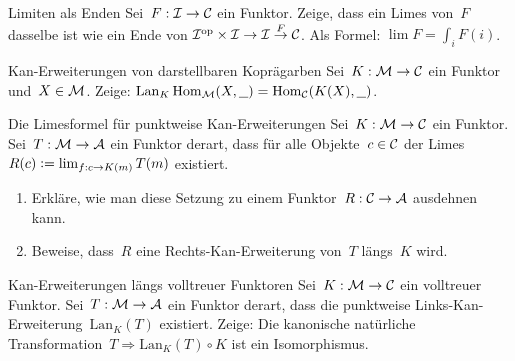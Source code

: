 \documentclass{uebblatt}
\begin{document}

\begin{aufgabe}{Limiten als Enden}
Sei~$F : \mathcal{I} \to \mathcal{C}$ ein Funktor. Zeige, dass ein Limes von~$F$ dasselbe ist wie ein
Ende von $\mathcal{I}^{\mathrm{op}} \times \mathcal{I} \to \mathcal{I} \stackrel{F}{\to} \mathcal{C}$. Als Formel: $\lim F =
\int_i F(i)$.
\end{aufgabe}

\begin{aufgabe}{Kan-Erweiterungen von darstellbaren Koprägarben}
Sei~$K : \mathcal{M} \to \mathcal{C}$ ein Funktor und~$X \in \mathcal{M}$. Zeige:
$\operatorname{Lan}_K \mathrm{Hom}_{\mathcal{M}}(X, \underline{\ \ }) =
  \mathrm{Hom}_{\mathcal{C}}(K(X), \underline{\ \ })$.
\end{aufgabe}

\begin{aufgabe}{Die Limesformel für punktweise Kan-Erweiterungen}
Sei~$K : \mathcal{M} \to \mathcal{C}$ ein Funktor. Sei~$T : \mathcal{M} \to \mathcal{A}$ ein Funktor derart, dass
für alle Objekte~$c \in \mathcal{C}$ der Limes~$R(c) \vcentcolon= \lim_{f:c \to K(m)} T(m)$
existiert.
\begin{enumerate}
\item Erkläre, wie man diese Setzung zu einem Funktor~$R : \mathcal{C} \to \mathcal{A}$ ausdehnen
kann.
\item Beweise, dass~$R$ eine Rechts-Kan-Erweiterung von~$T$ längs~$K$ wird.
\end{enumerate}
\end{aufgabe}

\begin{aufgabe}{Kan-Erweiterungen längs volltreuer Funktoren}
Sei~$K : \mathcal{M} \to \mathcal{C}$ ein volltreuer Funktor. Sei~$T : \mathcal{M} \to \mathcal{A}$ ein Funktor
derart, dass die punktweise Links-Kan-Erweiterung~$\mathrm{Lan}_K(T)$
existiert. Zeige: Die kanonische natürliche Transformation~$T \Rightarrow
\mathrm{Lan}_K(T) \circ K$ ist ein Isomorphismus.
\end{aufgabe}
\end{document}

